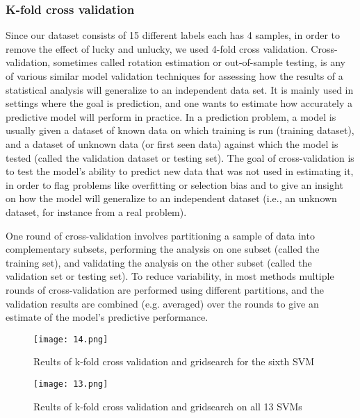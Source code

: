 \documentclass{article}
\begin{document}
{\subsubsection{K-fold cross validation}
\par{Since our dataset consists of 15 different labels each has 4 samples, in order to remove the effect  of lucky and unlucky, we used 4-fold cross validation. Cross-validation, sometimes called rotation estimation or out-of-sample testing, is any of various similar model validation techniques for assessing how the results of a statistical analysis will generalize to an independent data set. It is mainly used in settings where the goal is prediction, and one wants to estimate how accurately a predictive model will perform in practice. In a prediction problem, a model is usually given a dataset of known data on which training is run (training dataset), and a dataset of unknown data (or first seen data) against which the model is tested (called the validation dataset or testing set). The goal of cross-validation is to test the model's ability to predict new data that was not used in estimating it, in order to flag problems like overfitting or selection bias and to give an insight on how the model will generalize to an independent dataset (i.e., an unknown dataset, for instance from a real problem).}
\par{One round of cross-validation involves partitioning a sample of data into complementary subsets, performing the analysis on one subset (called the training set), and validating the analysis on the other subset (called the validation set or testing set). To reduce variability, in most methods multiple rounds of cross-validation are performed using different partitions, and the validation results are combined (e.g. averaged) over the rounds to give an estimate of the model's predictive performance.}

\begin{figure}[H]
    \centering
   \texttt{[image: 14.png]}
    \caption{Reults of k-fold cross validation and gridsearch for the sixth SVM }
    \label{simulationfigure}
\end{figure}

\begin{figure}[H]
    \centering
   \texttt{[image: 13.png]}
    \caption{Reults of k-fold cross validation and gridsearch on all 13 SVMs }
    \label{simulationfigure}
\end{figure}


}
\end{document}
